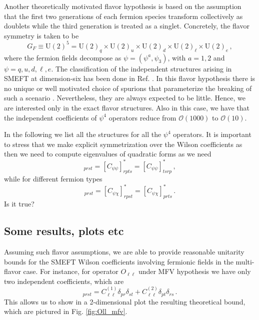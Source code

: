 \documentclass[a4paper,11pt]{article}
\newcommand{\lb}[1]{{\color{blue} #1}}
\begin{document}
Another theoretically motivated flavor hypothesis is based on the assumption that the first two generations of each fermion species transform collectively as doublets while the third generation is treated as a singlet. Concretely, the flavor symmetry is taken to be
\begin{equation}
    G_{F}\equiv\mathrm{U}(2)^5=\mathrm{U}(2)_q\times\mathrm{U}(2)_u\times\mathrm{U}(2)_d\times\mathrm{U}(2)_\ell\times\mathrm{U}(2)_e\,,
\end{equation}
where the fermion fields decompose as $\psi = (\psi^a,\psi_3)$, with $a=1,2$ and $\psi=q,u,d,\ell,e$.  The classification of the independent structures arising in SMEFT at dimension-six has been done in Ref. \cite{Faroughy:2020ina}. In this flavor hypothesis there is no unique or well motivated choice of spurions that parameterize the breaking of such a scenario \cite{Faroughy:2020ina,Greljo:2022cah}. Nevertheless, they are always expected to be little. Hence, we are interested only in the exact flavor structures. Also in this case, we have that the independent coefficients of $\psi^4$ operators reduce from $\mathcal{O}(1000)$ to $\mathcal{O}(10)$.

In the following we list all the structures for all the $\psi^4$ operators. It is important to stress that we make explicit symmetrization over the Wilson coefficients as then we need to compute eigenvalues of quadratic forms as we need 
\begin{equation}
    [C_{\psi\psi}]_{prst}=[C_{\psi\psi}]^*_{rpts}=[C_{\psi\psi}]^*_{tsrp}\,,
\end{equation}
while for different fermion types
\begin{equation}
    [C_{\psi\chi}]_{prst}=[C_{\psi\chi}]^*_{rpst}=[C_{\psi\chi}]^*_{prts}\,.
\end{equation}
\lb{Is it true?}

\subsection{Some results, plots etc}
Assuming such flavor assumptions, we are able to provide reasonable unitarity bounds for the SMEFT Wilson coefficients involving fermionic fields in the multi-flavor case. For instance, for operator $O_{\ell\ell}$ under MFV hypothesis we have only two independent coefficients, which are
\begin{equation}
    [C_{\ell\ell}]_{prst} = C_{\ell\ell}^{(1)}\delta_{pr}\delta_{st} + C_{\ell\ell}^{(2)}\delta_{pt}\delta_{rs}\,.
\end{equation}
This allows us to show in a 2-dimensional plot the resulting theoretical bound, which are pictured in Fig. \ref{fig:Oll_mfv}.
\end{document}

